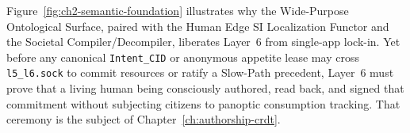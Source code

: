 Figure~\ref{fig:ch2-semantic-foundation} illustrates why the Wide-Purpose Ontological Surface, paired with the Human Edge SI Localization Functor and the Societal Compiler/Decompiler, liberates Layer~6 from single-app lock-in. Yet before any canonical \texttt{Intent\_CID} or anonymous appetite lease may cross \texttt{l5\_l6.sock} to commit resources or ratify a Slow-Path precedent, Layer~6 must prove that a living human being consciously authored, read back, and signed that commitment without subjecting citizens to panoptic consumption tracking. That ceremony is the subject of Chapter~\ref{ch:authorship-crdt}.
